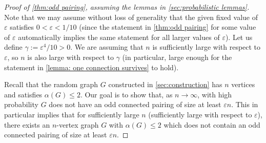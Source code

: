 \documentclass[11pt,reqno,oneside]{amsart}
\theoremstyle{definition}
\newcommand\1{\mathbf{1}}
\newcommand{\eps}{\varepsilon}
\let\leq\leqslant
\begin{document}
\begin{proof}[Proof of \cref{thm:odd pairing}, assuming the lemmas in \cref{sec:probabilistic lemmas}]
    Note that we may assume without loss of generality that the given fixed value of $\eps$ satisfies $0<\eps<1/10$ (since the statement in \cref{thm:odd pairing} for some value of $\eps$ automatically implies the same statement for all larger values of $\eps$). Let us define $\gamma := \eps^4/10>0$. We are assuming that $n$ is sufficiently large with respect to $\eps$, so $n$ is also large with respect to $\gamma$ (in particular, large enough for the statement in \cref{lemma: one connection survives} to hold).
    
     Recall that the random graph $G$ constructed in \cref{sec:construction} has $n$ vertices and satisfies $\alpha(G)\leq 2$. Our goal is to show that, as $n\to\infty$, with high probability $G$ does not have an odd connected pairing of size at least $\eps n$. This in particular implies that for sufficiently large $n$ (sufficiently large with respect to $\eps$), there exists an $n$-vertex graph $G$ with $\alpha(G)\leq 2$ which does not contain an odd connected pairing of size at least $\eps n$.
    

\end{proof}
\end{document}
